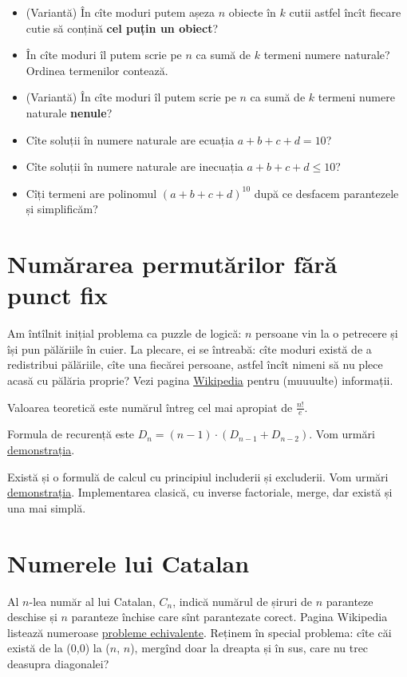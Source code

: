 \documentclass[../main.tex]{subfiles}
\begin{document}
\begin{itemize}
  \item (Variantă) În cîte moduri putem așeza $n$ obiecte în $k$ cutii astfel încît fiecare cutie să conțină \textbf{cel puțin un obiect}?
  \item În cîte moduri îl putem scrie pe $n$ ca sumă de $k$ termeni numere naturale? Ordinea termenilor contează.
  \item (Variantă) În cîte moduri îl putem scrie pe $n$ ca sumă de $k$ termeni numere naturale \textbf{nenule}?
  \item Cîte soluții în numere naturale are ecuația $a + b + c + d = 10$?
  \item Cîte soluții în numere naturale are inecuația $a + b + c + d \leq 10$?
  \item Cîți termeni are polinomul $(a + b + c + d)^{10}$ după ce desfacem parantezele și simplificăm?
\end{itemize}

\section{Numărarea permutărilor fără punct fix}

Am întîlnit inițial problema ca puzzle de logică: $n$ persoane vin la o petrecere și își pun pălăriile în cuier. La plecare, ei se întreabă: cîte moduri există de a redistribui pălăriile, cîte una fiecărei persoane, astfel încît nimeni să nu plece acasă cu pălăria proprie? Vezi pagina \href{https://en.wikipedia.org/wiki/Derangement}{Wikipedia} pentru (muuuulte) informații.

Valoarea teoretică este numărul întreg cel mai apropiat de $\frac{n!}{e}$.

Formula de recurență este $D_n = (n-1) \cdot (D_{n-1} + D_{n-2})$. Vom urmări \href{https://en.wikipedia.org/wiki/Derangement#Counting_derangements}{demonstrația}.

Există și o formulă de calcul cu principiul includerii și excluderii. Vom urmări \href{https://en.wikipedia.org/wiki/Derangement#Derivation_by_inclusion\%E2\%80\%93exclusion_principle}{demonstrația}. Implementarea clasică, cu inverse factoriale, merge, dar există și una mai simplă.

\section{Numerele lui Catalan}

Al $n$-lea număr al lui Catalan, $C_n$, indică numărul de șiruri de $n$ paranteze deschise și $n$ paranteze închise care sînt parantezate corect. Pagina Wikipedia listează numeroase \href{https://en.wikipedia.org/wiki/Catalan_number#Applications_in_combinatorics}{probleme echivalente}. Reținem în special problema: cîte căi există de la (0,0) la ($n$, $n$), mergînd doar la dreapta și în sus, care nu trec deasupra diagonalei?
\end{document}
